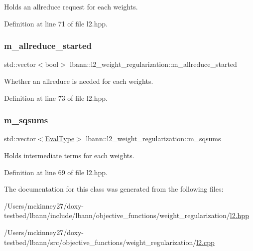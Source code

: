 Holds an allreduce request for each weights. 

Definition at line 71 of file l2.\+hpp.

\mbox{\label{classlbann_1_1l2__weight__regularization_a0ae4858adb3279c0019f5e0500bdcf4f}} 
\subsubsection{\texorpdfstring{m\+\_\+allreduce\+\_\+started}{m\_allreduce\_started}}
{\footnotesize\ttfamily std\+::vector$<$bool$>$ lbann\+::l2\+\_\+weight\+\_\+regularization\+::m\+\_\+allreduce\+\_\+started\hspace{0.3cm}{\ttfamily [private]}}

Whether an allreduce is needed for each weights. 

Definition at line 73 of file l2.\+hpp.

\mbox{\label{classlbann_1_1l2__weight__regularization_a628aabb4e824f2aa861baba93668dc24}} 
\subsubsection{\texorpdfstring{m\+\_\+sqsums}{m\_sqsums}}
{\footnotesize\ttfamily std\+::vector$<$\hyperlink{base_8hpp_a3266f5ac18504bbadea983c109566867}{Eval\+Type}$>$ lbann\+::l2\+\_\+weight\+\_\+regularization\+::m\+\_\+sqsums\hspace{0.3cm}{\ttfamily [private]}}

Holds intermediate terms for each weights. 

Definition at line 69 of file l2.\+hpp.



The documentation for this class was generated from the following files\+:\begin{DoxyCompactItemize}
\item 
/\+Users/mckinney27/doxy-\/testbed/lbann/include/lbann/objective\+\_\+functions/weight\+\_\+regularization/\hyperlink{l2_8hpp}{l2.\+hpp}\item 
/\+Users/mckinney27/doxy-\/testbed/lbann/src/objective\+\_\+functions/weight\+\_\+regularization/\hyperlink{l2_8cpp}{l2.\+cpp}\end{DoxyCompactItemize}
